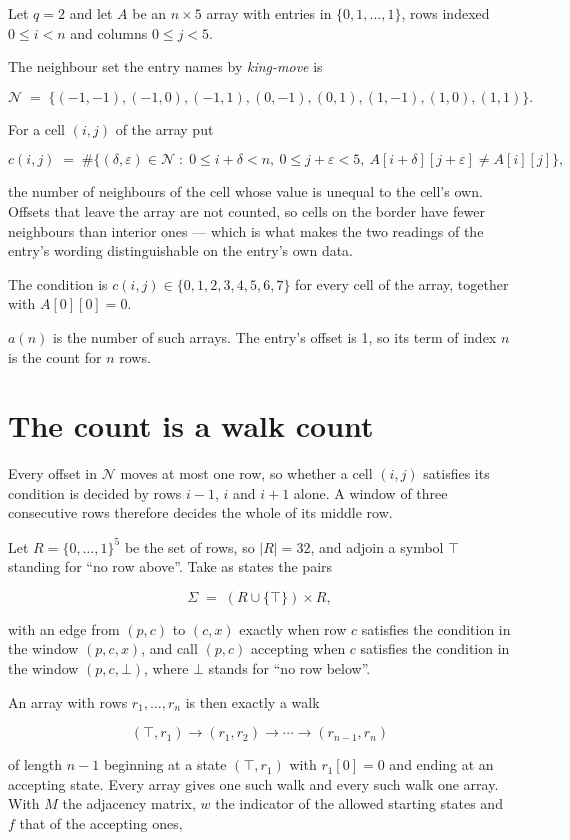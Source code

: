 \documentclass[11pt]{article}
\theoremstyle{definition}
\begin{document}
Let $q = 2$ and let $A$ be an $n \times 5$ array with entries in $\{0,1,\dots,1\}$, rows indexed $0 \le i < n$ and columns $0 \le j < 5$.

The neighbour set the entry names by {\itshape king-move} is

\[\mathcal{N} \;=\; \{(-1,-1), (-1,0), (-1,1), (0,-1), (0,1), (1,-1), (1,0), (1,1)\}.\]

For a cell $(i,j)$ of the array put

\[c(i,j) \;=\; \#\bigl\{(\delta,\varepsilon)\in\mathcal{N} \;:\; 0\le i+\delta<n,\ 0\le j+\varepsilon<5,\ A[i+\delta][j+\varepsilon] \neq A[i][j]\bigr\},\]

the number of neighbours of the cell whose value is unequal to the cell's own. Offsets that leave the array are not counted, so cells on the border have fewer neighbours than interior ones --- which is what makes the two readings of the entry's wording distinguishable on the entry's own data.

The condition is $c(i,j) \in \{0, 1, 2, 3, 4, 5, 6, 7\}$ for every cell of the array, together with $A[0][0]=0$.

$a(n)$ is the number of such arrays. The entry's offset is 1, so its term of index $n$ is the count for $n$ rows.

\section{The count is a walk count}

Every offset in $\mathcal{N}$ moves at most one row, so whether a cell $(i,j)$ satisfies its condition is decided by rows $i-1$, $i$ and $i+1$ alone. A window of three consecutive rows therefore decides the whole of its middle row.

Let $R = \{0,\dots,1\}^{5}$ be the set of rows, so $|R| = 32$, and adjoin a symbol $\top$ standing for ``no row above''. Take as states the pairs

\[\Sigma \;=\; (R \cup \{\top\}) \times R,\]

with an edge from $(p,c)$ to $(c,x)$ exactly when row $c$ satisfies the condition in the window $(p,c,x)$, and call $(p,c)$ accepting when $c$ satisfies the condition in the window $(p,c,\bot)$, where $\bot$ stands for ``no row below''.

An array with rows $r_1,\dots,r_n$ is then exactly a walk

\[(\top,r_1) \to (r_1,r_2) \to \cdots \to (r_{n-1},r_n)\]

of length $n-1$ beginning at a state $(\top,r_1)$ with $r_1[0]=0$ and ending at an accepting state. Every array gives one such walk and every such walk one array. With $M$ the adjacency matrix, $w$ the indicator of the allowed starting states and $f$ that of the accepting ones,
\end{document}

